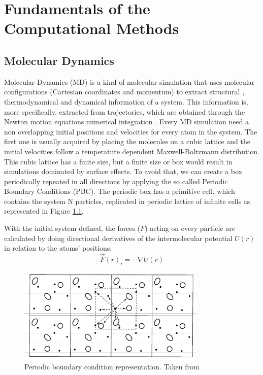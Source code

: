 
\chapter{Fundamentals of the Computational Methods} %

\label{Chapter3} %


\section{Molecular Dynamics}
Molecular Dynamics (MD) is a kind of molecular simulation that uses molecular configurations (Cartesian coordinates and momentum) to extract structural , thermodynamical and dynamical information of a system. This information is, more specifically, extracted from trajectories, which are obtained  through the Newton motion equations numerical integration \cite{tuckerman}. Every MD simulation need a non overlapping initial positions and velocities for every atom in the system. The first one is usually acquired by placing the molecules on a cubic lattice and the initial velocities follow a temperature dependent Maxwell-Boltzmann distribution. This cubic lattice has a finite size, but  a finite size or box would result in simulations dominated by surface effects. To avoid that, we can create a box periodically repeated in all directions by applying the so called Periodic Boundary Conditions (PBC). The periodic box has a primitive cell, which contains the system N particles, replicated in periodic lattice of infinite cells as represented in Figure \ref{fig:pbc}\cite{frenkel}.

With the initial system defined, the forces ($F$) acting on every particle are calculated by doing directional derivatives of the intermolecular potential $U(r)$ in relation to the atoms' positions:
\begin{equation}
\label{eq:forces}
 \vec{F }(r)_{i} =  - \nabla U(r)
\end{equation}
\setlength{\parskip}{6mm}
\FloatBarrier
\begin{figure}
	\centering
	\includegraphics[width=0.8\textwidth]{Figures/pbc}
	\caption{Periodic boundary condition representation. Taken from }
	\label{fig:pbc}
\end{figure}
\FloatBarrier

